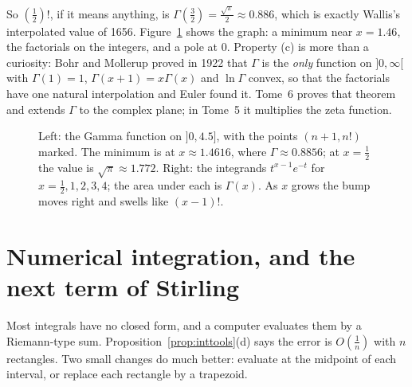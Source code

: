 So $\left(\frac12\right)!$, if it means anything, is $\Gamma\left(\frac32\right)=\frac{\sqrt\pi}2\approx0.886$, which is exactly Wallis's interpolated value of 1656. Figure~\ref{fig:gammafn}
shows the graph: a minimum near $x=1.46$, the factorials on the integers, and a pole at $0$. Property (c) is more than a curiosity: Bohr and Mollerup
proved in 1922 that $\Gamma$ is the \emph{only} function on $]0,\infty[$ with $\Gamma(1)=1$, $\Gamma(x+1)=x\Gamma(x)$ and $\ln\Gamma$ convex, so that the
factorials have one natural interpolation and Euler found it. Tome~6 proves that theorem and extends $\Gamma$ to the complex plane; in Tome~5 it multiplies
the zeta function.

\begin{figure}[ht]
\centering
{}
\caption{Left: the Gamma function on $]0,4.5]$, with the points $(n+1,n!)$ marked. The minimum is at $x\approx1.4616$, where $\Gamma\approx0.8856$; at $x=\frac12$ the value is $\sqrt\pi\approx1.772$. Right: the integrands $t^{x-1}e^{-t}$ for $x=\frac12,1,2,3,4$; the area under each is $\Gamma(x)$. As $x$ grows the bump moves right and swells like $(x-1)!$.}
\label{fig:gammafn}
\end{figure}

\section{Numerical integration, and the next term of Stirling}

Most integrals have no closed form, and a computer evaluates them by a Riemann-type sum. Proposition~\ref{prop:inttools}(d) says the error is $O\left(\frac1n\right)$
with $n$ rectangles. Two small changes do much better: evaluate at the midpoint of each interval, or replace each rectangle by a trapezoid.

